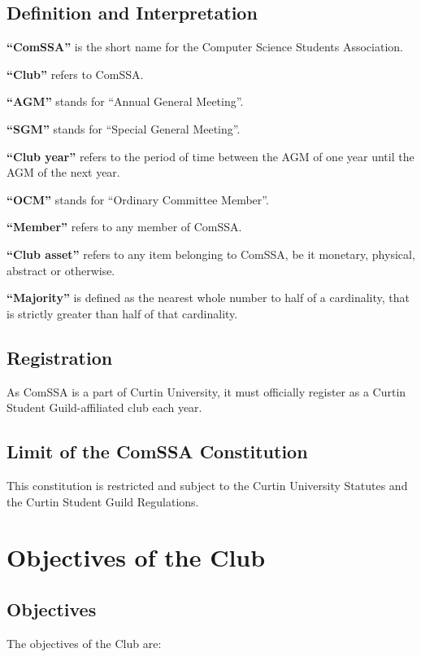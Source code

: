 \documentclass[a4paper,12pt]{article}
\begin{document}
\subsection{Definition and Interpretation}

\textbf{``ComSSA''} is the short name for the Computer Science Students Association.

\textbf{``Club''} refers to ComSSA.

\textbf{``AGM''} stands for ``Annual General Meeting''.

\textbf{``SGM''} stands for ``Special General Meeting''.

\textbf{``Club year''} refers to the period of time between the AGM of one year until the AGM of the next year.

\textbf{``OCM''} stands for ``Ordinary Committee Member''.

\textbf{``Member''} refers to any member of ComSSA.

\textbf{``Club asset''} refers to any item belonging to ComSSA, be it monetary, physical, abstract or otherwise.

\textbf{``Majority''} is defined as the nearest whole number to half of a cardinality, that is strictly greater than half of that cardinality.

\subsection{Registration}

As ComSSA is a part of Curtin University, it must officially register as a Curtin Student Guild-affiliated club each year.

\subsection{Limit of the ComSSA Constitution}

This constitution is restricted and subject to the Curtin University Statutes and the Curtin Student Guild Regulations.

\section{Objectives of the Club}

\subsection{Objectives}

The objectives of the Club are:
\end{document}
